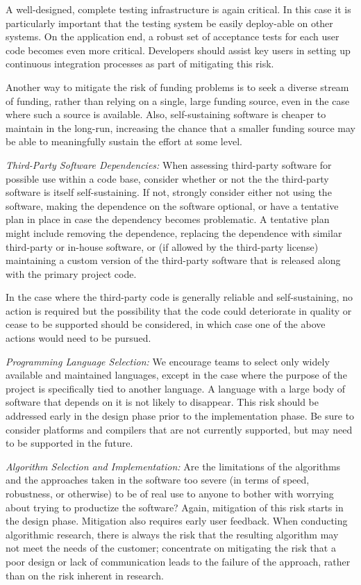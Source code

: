 \documentclass[11pt]{SANDreport}
\begin{document}
A well-designed, complete testing infrastructure is again critical.
In this case it is particularly important that the testing system be
easily deploy-able on other systems.  On the application end, a robust
set of acceptance tests for each user code becomes even more critical.
Developers should assist key users in setting up continuous
integration processes as part of mitigating this risk.

Another way to mitigate the risk of funding problems is to seek a diverse
stream of funding, rather than relying on a single, large funding source, even
in the case where such a source is available.  Also, self-sustaining software
is cheaper to maintain in the long-run, increasing the chance that a smaller
funding source may be able to meaningfully sustain the effort at some level.

{}\textit{Third-Party Software Dependencies:} When assessing
third-party software for possible use within a code base, consider
whether or not the the third-party software is itself self-sustaining.
If not, strongly consider either not using the software, making the
dependence on the software optional, or have a tentative plan in place
in case the dependency becomes problematic.  A tentative plan might
include removing the dependence, replacing the dependence with similar
third-party or in-house software, or (if allowed by the third-party
license) maintaining a custom version of the third-party software that
is released along with the primary project code.

In the case where the third-party code is generally reliable and
self-sustaining, no action is required but the possibility that the
code could deteriorate in quality or cease to be supported should be
considered, in which case one of the above actions would need to be
pursued.

{}\textit{Programming Language Selection:} We encourage teams to
select only widely available and maintained languages, except in the
case where the purpose of the project is specifically tied to another
language.  A language with a large body of software that depends on it
is not likely to disappear.  This risk should be addressed early in
the design phase prior to the implementation phase.  Be sure to
consider platforms and compilers that are not currently supported, but
may need to be supported in the future.

{}\textit{Algorithm Selection and Implementation:} Are the limitations
of the algorithms and the approaches taken in the software too severe
(in terms of speed, robustness, or otherwise) to be of real use to
anyone to bother with worrying about trying to productize the
software?  Again, mitigation of this risk starts in the design phase.
Mitigation also requires early user feedback.  When conducting
algorithmic research, there is always the risk that the resulting
algorithm may not meet the needs of the customer; concentrate on
mitigating the risk that a poor design or lack of communication leads
to the failure of the approach, rather than on the risk inherent in
research.
\end{document}
